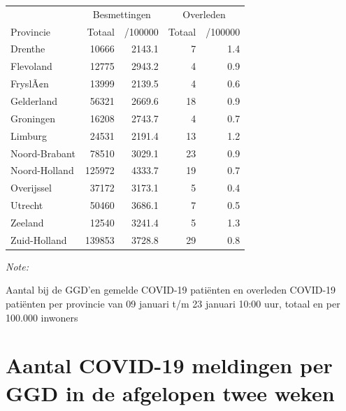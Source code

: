 \documentclass[
  english,
  man,floatsintext]{apa6}
\begin{document}
\begin{table}
\centering
\begin{threeparttable}
\begin{tabular}{lrrrr}
\toprule
\multicolumn{1}{c}{ } & \multicolumn{2}{c}{Besmettingen} & \multicolumn{2}{c}{Overleden} \\
\cmidrule(l{3pt}r{3pt}){2-3} \cmidrule(l{3pt}r{3pt}){4-5}
Provincie & Totaal & /100000 & Totaal & /100000\\
\midrule
Drenthe & 10666 & 2143.1 & 7 & 1.4\\
Flevoland & 12775 & 2943.2 & 4 & 0.9\\
FryslÃ¢n & 13999 & 2139.5 & 4 & 0.6\\
Gelderland & 56321 & 2669.6 & 18 & 0.9\\
Groningen & 16208 & 2743.7 & 4 & 0.7\\
Limburg & 24531 & 2191.4 & 13 & 1.2\\
Noord-Brabant & 78510 & 3029.1 & 23 & 0.9\\
Noord-Holland & 125972 & 4333.7 & 19 & 0.7\\
Overijssel & 37172 & 3173.1 & 5 & 0.4\\
Utrecht & 50460 & 3686.1 & 7 & 0.5\\
Zeeland & 12540 & 3241.4 & 5 & 1.3\\
Zuid-Holland & 139853 & 3728.8 & 29 & 0.8\\
\bottomrule
\end{tabular}
\begin{tablenotes}
\item \textit{Note: } 
\item Aantal bij de GGD’en gemelde COVID-19 patiënten en overleden COVID-19 patiënten per provincie van 09 januari t/m 23 januari 10:00 uur, totaal en per 100.000 inwoners
\end{tablenotes}
\end{threeparttable}
\end{table}

\newpage

\hypertarget{aantal-covid-19-meldingen-per-ggd-in-de-afgelopen-twee-weken}{%
\section{Aantal COVID-19 meldingen per GGD in de afgelopen twee weken}\label{aantal-covid-19-meldingen-per-ggd-in-de-afgelopen-twee-weken}}
\end{document}
